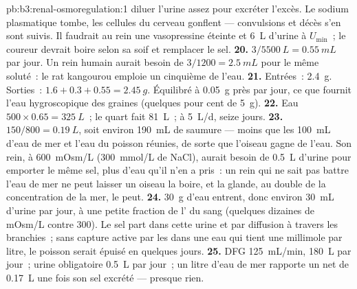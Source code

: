 \begin{solution}{pb:b3:renal-osmoregulation:1}
diluer l'urine assez pour excréter l'excès. Le sodium plasmatique tombe,
les cellules du cerveau gonflent --- convulsions et décès s'en sont
suivis. Il faudrait au rein une vasopressine éteinte et \qty{6}{L}
d'urine à $U_{\min}$~; le coureur devrait boire selon sa soif et
remplacer le sel.
\textbf{20.} $3/5500\ \unit{L} = \qty{0.55}{mL}$ par jour. Un rein humain
aurait besoin de $3/1200 = \qty{2.5}{mL}$ pour le même soluté~: le rat
kangourou emploie un cinquième de l'eau.
\textbf{21.} Entrées~: \qty{2.4}{g}. Sorties~: $1.6 + 0.3 + 0.55 = \qty{2.45}{g}$.
Équilibré à \qty{0.05}{g} près par jour, ce que fournit l'eau
hygroscopique des graines (quelques pour cent de \qty{5}{g}).
\textbf{22.} Eau $500\times 0.65 = \qty{325}{L}$~; le quart fait
\qty{81}{L}~; à \qty{5}{L/d}, seize jours.
\textbf{23.} $150/800 = \qty{0.19}{L}$, soit environ \qty{190}{mL} de
saumure --- moins que les \qty{100}{mL} d'eau de mer et l'eau du poisson
réunies, de sorte que l'oiseau gagne de l'eau. Son rein, à
\qty{600}{mOsm/L} (\qty{300}{mmol/L} de NaCl), aurait besoin de
\qty{0.5}{L} d'urine pour emporter le même sel, plus d'eau qu'il n'en a
pris~: un rein qui ne sait pas battre l'eau de mer ne peut laisser un
oiseau la boire, et la glande, au double de la concentration de la mer,
le peut.
\textbf{24.} \qty{30}{g} d'eau entrent, donc environ \qty{30}{mL} d'urine
par jour, à une petite fraction de l' du sang (quelques
dizaines de mOsm/L contre \num{300}). Le sel part dans cette urine et par
diffusion à travers les branchies~; sans capture active par les  dans une eau qui tient une millimole par litre, le poisson
serait épuisé en quelques jours.
\textbf{25.} DFG \qty{125}{mL/min}, \qty{180}{L} par jour~; urine
obligatoire \qty{0.5}{L} par jour~; un litre d'eau de mer rapporte un net
de \qty{0.17}{L} une fois son sel excrété --- presque rien.
\end{solution}
